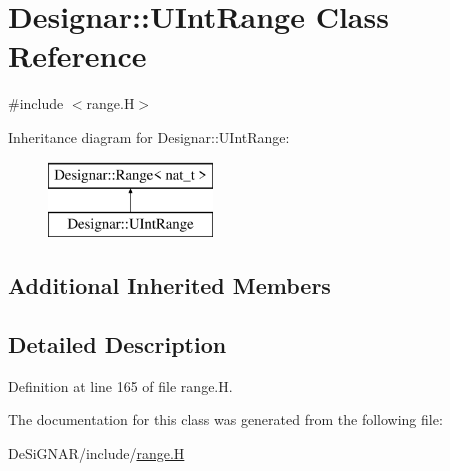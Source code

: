 \hypertarget{class_designar_1_1_u_int_range}{}\section{Designar\+:\+:U\+Int\+Range Class Reference}
\label{class_designar_1_1_u_int_range}


{\ttfamily \#include $<$range.\+H$>$}

Inheritance diagram for Designar\+:\+:U\+Int\+Range\+:\begin{figure}[H]
\begin{center}
\leavevmode
\includegraphics[height=2.000000cm]{class_designar_1_1_u_int_range}
\end{center}
\end{figure}
\subsection*{Additional Inherited Members}


\subsection{Detailed Description}


Definition at line 165 of file range.\+H.



The documentation for this class was generated from the following file\+:\begin{DoxyCompactItemize}
\item 
De\+Si\+G\+N\+A\+R/include/\hyperlink{range_8_h}{range.\+H}\end{DoxyCompactItemize}
